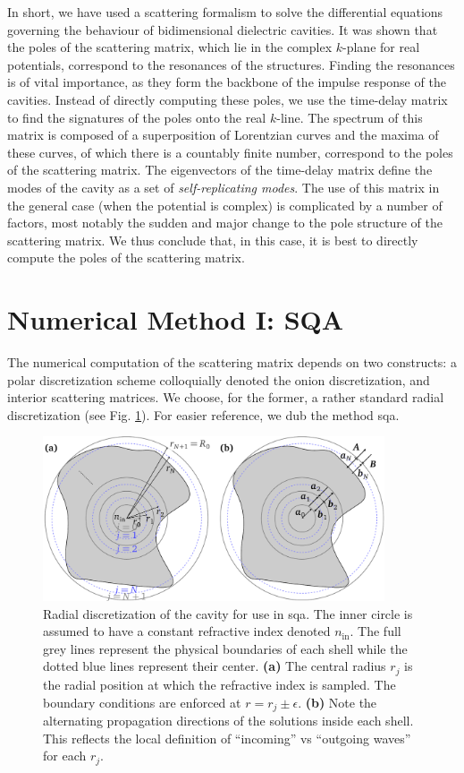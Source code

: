 In short, we have used a scattering formalism to solve the differential 
equations governing the behaviour of bidimensional dielectric cavities. 
It was shown that the poles of the scattering matrix, which lie in the 
complex $k$-plane for real potentials, correspond to the resonances
of the structures. Finding the resonances is of vital importance, as
they form the backbone of the impulse response of the cavities. 
Instead of directly computing these poles, we use the time-delay matrix
to find the signatures of the poles onto the real $k$-line. The spectrum
of this matrix is composed of a superposition of Lorentzian curves
and the maxima of these curves, of which there is a countably finite number, 
correspond to the poles of the scattering matrix. The eigenvectors of the 
time-delay matrix define the modes of the cavity as a set of 
\textit{self-replicating modes}. The use of this matrix 
in the general case (when the potential is complex) is complicated
by a number of factors, most notably the sudden and major change to the
pole structure of the scattering matrix. We thus conclude that, in this case, 
it is best to directly compute the poles of the scattering matrix.

\section{Numerical Method I: SQA}
The numerical computation of the scattering matrix 
depends on two constructs: a polar discretization 
scheme colloquially denoted the onion discretization, and interior scattering matrices. We choose, for
the former, a rather standard radial discretization 
(see Fig. \ref{fig:passive.numerical.radialDiscretization}).
For easier reference, we dub the method \gls{sqa}.

\begin{figure}
 \centering
 \includegraphics[width=0.9\textwidth]{figs/passive/figDisScatCoeff.pdf}
 \caption[Radial discretization for use in SQA]
	 {Radial discretization of the cavity for use in \gls{sqa}. The inner circle is assumed to 
	 have a constant refractive index denoted $n_\text{in}$. The full grey lines represent
	 the physical boundaries of each shell while the dotted blue lines represent their
	 center. \textbf{(a)} The central radius $r_j$ is the radial position at which the 
	 refractive index is sampled. The boundary conditions are enforced at $r=r_j\pm\epsilon$.
	 \textbf{(b)} Note the alternating propagation directions of the solutions inside each shell.
	 This reflects the local definition of ``incoming'' vs ``outgoing waves'' for each $r_j$.}
  \label{fig:passive.numerical.radialDiscretization}
\end{figure}


